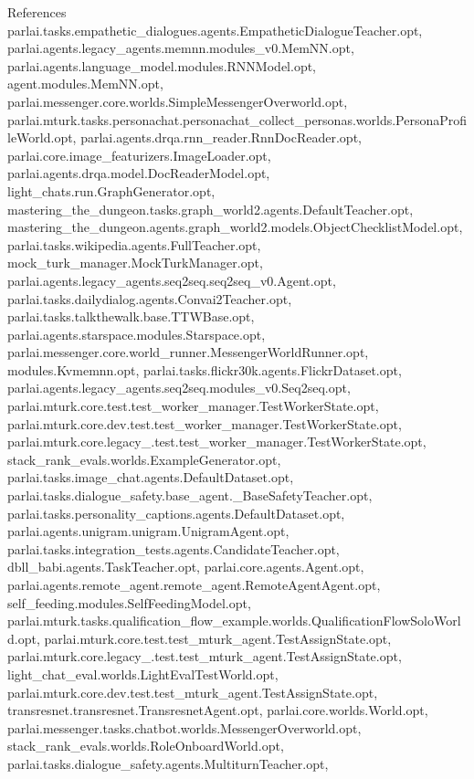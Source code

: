 References parlai.\+tasks.\+empathetic\+\_\+dialogues.\+agents.\+Empathetic\+Dialogue\+Teacher.\+opt, parlai.\+agents.\+legacy\+\_\+agents.\+memnn.\+modules\+\_\+v0.\+Mem\+N\+N.\+opt, parlai.\+agents.\+language\+\_\+model.\+modules.\+R\+N\+N\+Model.\+opt, agent.\+modules.\+Mem\+N\+N.\+opt, parlai.\+messenger.\+core.\+worlds.\+Simple\+Messenger\+Overworld.\+opt, parlai.\+mturk.\+tasks.\+personachat.\+personachat\+\_\+collect\+\_\+personas.\+worlds.\+Persona\+Profile\+World.\+opt, parlai.\+agents.\+drqa.\+rnn\+\_\+reader.\+Rnn\+Doc\+Reader.\+opt, parlai.\+core.\+image\+\_\+featurizers.\+Image\+Loader.\+opt, parlai.\+agents.\+drqa.\+model.\+Doc\+Reader\+Model.\+opt, light\+\_\+chats.\+run.\+Graph\+Generator.\+opt, mastering\+\_\+the\+\_\+dungeon.\+tasks.\+graph\+\_\+world2.\+agents.\+Default\+Teacher.\+opt, mastering\+\_\+the\+\_\+dungeon.\+agents.\+graph\+\_\+world2.\+models.\+Object\+Checklist\+Model.\+opt, parlai.\+tasks.\+wikipedia.\+agents.\+Full\+Teacher.\+opt, mock\+\_\+turk\+\_\+manager.\+Mock\+Turk\+Manager.\+opt, parlai.\+agents.\+legacy\+\_\+agents.\+seq2seq.\+seq2seq\+\_\+v0.\+Agent.\+opt, parlai.\+tasks.\+dailydialog.\+agents.\+Convai2\+Teacher.\+opt, parlai.\+tasks.\+talkthewalk.\+base.\+T\+T\+W\+Base.\+opt, parlai.\+agents.\+starspace.\+modules.\+Starspace.\+opt, parlai.\+messenger.\+core.\+world\+\_\+runner.\+Messenger\+World\+Runner.\+opt, modules.\+Kvmemnn.\+opt, parlai.\+tasks.\+flickr30k.\+agents.\+Flickr\+Dataset.\+opt, parlai.\+agents.\+legacy\+\_\+agents.\+seq2seq.\+modules\+\_\+v0.\+Seq2seq.\+opt, parlai.\+mturk.\+core.\+test.\+test\+\_\+worker\+\_\+manager.\+Test\+Worker\+State.\+opt, parlai.\+mturk.\+core.\+dev.\+test.\+test\+\_\+worker\+\_\+manager.\+Test\+Worker\+State.\+opt, parlai.\+mturk.\+core.\+legacy\+\_.\+test.\+test\+\_\+worker\+\_\+manager.\+Test\+Worker\+State.\+opt, stack\+\_\+rank\+\_\+evals.\+worlds.\+Example\+Generator.\+opt, parlai.\+tasks.\+image\+\_\+chat.\+agents.\+Default\+Dataset.\+opt, parlai.\+tasks.\+dialogue\+\_\+safety.\+base\+\_\+agent.\+\_\+\+Base\+Safety\+Teacher.\+opt, parlai.\+tasks.\+personality\+\_\+captions.\+agents.\+Default\+Dataset.\+opt, parlai.\+agents.\+unigram.\+unigram.\+Unigram\+Agent.\+opt, parlai.\+tasks.\+integration\+\_\+tests.\+agents.\+Candidate\+Teacher.\+opt, dbll\+\_\+babi.\+agents.\+Task\+Teacher.\+opt, parlai.\+core.\+agents.\+Agent.\+opt, parlai.\+agents.\+remote\+\_\+agent.\+remote\+\_\+agent.\+Remote\+Agent\+Agent.\+opt, self\+\_\+feeding.\+modules.\+Self\+Feeding\+Model.\+opt, parlai.\+mturk.\+tasks.\+qualification\+\_\+flow\+\_\+example.\+worlds.\+Qualification\+Flow\+Solo\+World.\+opt, parlai.\+mturk.\+core.\+test.\+test\+\_\+mturk\+\_\+agent.\+Test\+Assign\+State.\+opt, parlai.\+mturk.\+core.\+legacy\+\_.\+test.\+test\+\_\+mturk\+\_\+agent.\+Test\+Assign\+State.\+opt, light\+\_\+chat\+\_\+eval.\+worlds.\+Light\+Eval\+Test\+World.\+opt, parlai.\+mturk.\+core.\+dev.\+test.\+test\+\_\+mturk\+\_\+agent.\+Test\+Assign\+State.\+opt, transresnet.\+transresnet.\+Transresnet\+Agent.\+opt, parlai.\+core.\+worlds.\+World.\+opt, parlai.\+messenger.\+tasks.\+chatbot.\+worlds.\+Messenger\+Overworld.\+opt, stack\+\_\+rank\+\_\+evals.\+worlds.\+Role\+Onboard\+World.\+opt, parlai.\+tasks.\+dialogue\+\_\+safety.\+agents.\+Multiturn\+Teacher.\+opt, 
